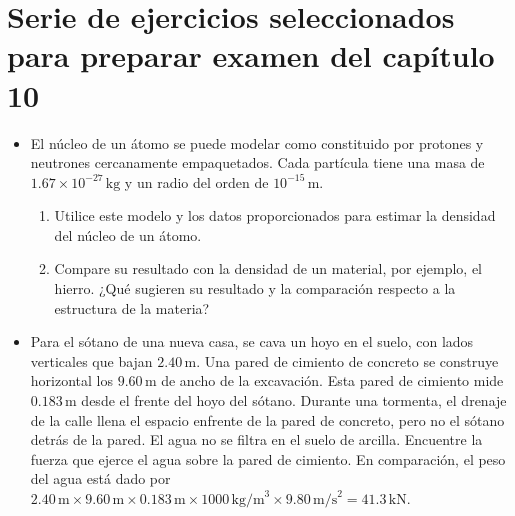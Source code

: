 \documentclass[11pt,a4paper]{article}
\begin{document}
\section*{Serie de ejercicios seleccionados para preparar examen del capítulo 10}

\begin{itemize}
    \item[\textbf{1.}] El núcleo de un átomo se puede modelar como constituido por protones y neutrones cercanamente empaquetados. Cada partícula tiene una masa de \(1.67 \times 10^{-27}\,\text{kg}\) y un radio del orden de \(10^{-15}\,\text{m}\).
    \begin{enumerate}
        \item[\textbf{(a)}] Utilice este modelo y los datos proporcionados para estimar la densidad del núcleo de un átomo.
        \item[\textbf{(b)}] Compare su resultado con la densidad de un material, por ejemplo, el hierro. ¿Qué sugieren su resultado y la comparación respecto a la estructura de la materia?
    \end{enumerate}
    \vspace*{7cm}
    
    \item[\textbf{2.}] Para el sótano de una nueva casa, se cava un hoyo en el suelo, con lados verticales que bajan \(2.40\,\text{m}\). Una pared de cimiento de concreto se construye horizontal los \(9.60\,\text{m}\) de ancho de la excavación. Esta pared de cimiento mide \(0.183\,\text{m}\) desde el frente del hoyo del sótano. Durante una tormenta, el drenaje de la calle llena el espacio enfrente de la pared de concreto, pero no el sótano detrás de la pared. El agua no se filtra en el suelo de arcilla. Encuentre la fuerza que ejerce el agua sobre la pared de cimiento. En comparación, el peso del agua está dado por \(2.40\,\text{m} \times 9.60\,\text{m} \times 0.183\,\text{m} \times 1000\,\text{kg/m}^3 \times 9.80\,\text{m/s}^2 = 41.3\,\text{kN}\).
    \vspace*{7cm}
\end{itemize}

\newpage
\end{document}
